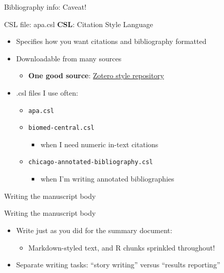 \documentclass[
  ignorenonframetext,
]{beamer}
\providecommand{\tightlist}{%
  \setlength{\itemsep}{0pt}\setlength{\parskip}{0pt}}
\begin{document}
\begin{frame}[fragile]
\begin{block}{Bibliography info: Caveat!}
\end{block}

\begin{block}{CSL file: apa.csl \textbar{} \textbf{CSL}: Citation Style
Language}

\begin{itemize}
\tightlist
\item
  Specifies how you want citations and bibliography formatted
\item
  Downloadable from many sources

  \begin{itemize}
  \tightlist
  \item
    \textbf{One good source}:
    \href{https://www.zotero.org/styles}{Zotero style repository}
  \end{itemize}
\item
  .csl files I use often:

  \begin{itemize}
  \tightlist
  \item
    \texttt{apa.csl}
  \item
    \texttt{biomed-central.csl}

    \begin{itemize}
    \tightlist
    \item
      when I need numeric in-text citations
    \end{itemize}
  \item
    \texttt{chicago-annotated-bibliography.csl}

    \begin{itemize}
    \tightlist
    \item
      when I'm writing annotated bibliographies
    \end{itemize}
  \end{itemize}
\end{itemize}

\end{block}

\end{frame}

\begin{frame}{Writing the manuscript body}
\protect\hypertarget{writing-the-manuscript-body}{}

\begin{block}{Writing the manuscript body}

\begin{itemize}
\tightlist
\item
  Write just as you did for the summary document:

  \begin{itemize}
  \tightlist
  \item
    Markdown-styled text, and R chunks sprinkled throughout!
  \end{itemize}
\item
  Separate writing tasks: ``story writing'' versus ``results reporting''
\end{itemize}

\end{block}

\end{frame}
\end{document}
